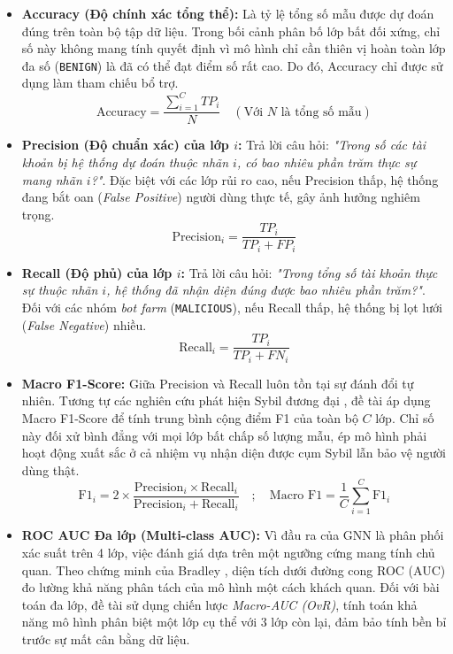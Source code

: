 \begin{itemize}[label={--}, itemsep=1pt]
    \item \textbf{Accuracy (Độ chính xác tổng thể):} Là tỷ lệ tổng số mẫu được dự đoán đúng trên toàn bộ tập dữ liệu. Trong bối cảnh phân bố lớp bất đối xứng, chỉ số này không mang tính quyết định vì mô hình chỉ cần thiên vị hoàn toàn lớp đa số (\texttt{BENIGN}) là đã có thể đạt điểm số rất cao. Do đó, Accuracy chỉ được sử dụng làm tham chiếu bổ trợ.
    \[
        \text{Accuracy} = \frac{\sum_{i=1}^{C} TP_i}{N} \quad (\text{Với } N \text{ là tổng số mẫu})
    \]

    \item \textbf{Precision (Độ chuẩn xác) của lớp $i$:} Trả lời câu hỏi: \textit{"Trong số các tài khoản bị hệ thống dự đoán thuộc nhãn $i$, có bao nhiêu phần trăm thực sự mang nhãn $i$?"}. Đặc biệt với các lớp rủi ro cao, nếu Precision thấp, hệ thống đang bắt oan (\textit{False Positive}) người dùng thực tế, gây ảnh hưởng nghiêm trọng.
    \[
        \text{Precision}_i = \frac{TP_i}{TP_i + FP_i}
    \]

    \item \textbf{Recall (Độ phủ) của lớp $i$:} Trả lời câu hỏi: \textit{"Trong tổng số tài khoản thực sự thuộc nhãn $i$, hệ thống đã nhận diện đúng được bao nhiêu phần trăm?"}. Đối với các nhóm \textit{bot farm} (\texttt{MALICIOUS}), nếu Recall thấp, hệ thống bị lọt lưới (\textit{False Negative}) nhiều.
    \[
        \text{Recall}_i = \frac{TP_i}{TP_i + FN_i}
    \]

    \item \textbf{Macro F1-Score:} Giữa Precision và Recall luôn tồn tại sự đánh đổi tự nhiên. Tương tự các nghiên cứu phát hiện Sybil đương đại \cite{liu2025detecting, heeb2024sybil}, đề tài áp dụng Macro F1-Score để tính trung bình cộng điểm F1 của toàn bộ $C$ lớp. Chỉ số này đối xử bình đẳng với mọi lớp bất chấp số lượng mẫu, ép mô hình phải hoạt động xuất sắc ở cả nhiệm vụ nhận diện được cụm Sybil lẫn bảo vệ người dùng thật.
    \[
        \text{F1}_i = 2 \times \frac{\text{Precision}_i \times \text{Recall}_i}{\text{Precision}_i + \text{Recall}_i} \quad ; \quad \text{Macro F1} = \frac{1}{C} \sum_{i=1}^{C} \text{F1}_i
    \]

    \item \textbf{ROC AUC Đa lớp (Multi-class AUC):} Vì đầu ra của GNN là phân phối xác suất trên 4 lớp, việc đánh giá dựa trên một ngưỡng cứng mang tính chủ quan. Theo chứng minh của Bradley \cite{bradley1997use}, diện tích dưới đường cong ROC (AUC) đo lường khả năng phân tách của mô hình một cách khách quan. Đối với bài toán đa lớp, đề tài sử dụng chiến lược \textit{Macro-AUC (OvR)}, tính toán khả năng mô hình phân biệt một lớp cụ thể với 3 lớp còn lại, đảm bảo tính bền bỉ trước sự mất cân bằng dữ liệu.
\end{itemize}